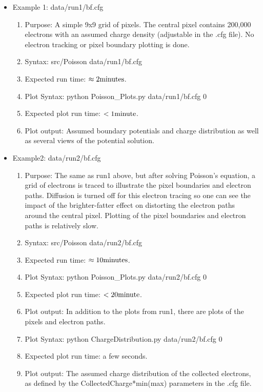 \documentclass{article} %
\begin{document}
\begin{itemize}
  \item Example 1: data/run1/bf.cfg
    \begin{enumerate}
      \item Purpose: A simple 9x9 grid of pixels.  The central pixel contains 200,000 electrons with an assumed charge density (adjustable in the .cfg file).  No electron tracking or pixel boundary plotting is done.  
      \item Syntax: src/Poisson data/run1/bf.cfg
      \item Expected run time: $\rm \approx 2 minutes$.
      \item Plot Syntax: python Poisson\_Plots.py data/run1/bf.cfg 0
      \item Expected plot run time: $\rm <1 minute$.
      \item Plot output: Assumed boundary potentials and charge distribution as well as several views of the potential solution. 
    \end{enumerate}

      \item Example2: data/run2/bf.cfg
    \begin{enumerate}
      \item Purpose: The same as run1 above, but after solving Poisson's equation, a grid of electrons is traced to illustrate the pixel boundaries and electron paths. Diffusion is turned off for this electron tracing so one can see the impact of the brighter-fatter effect on distorting the electron paths around the central pixel.  Plotting of the pixel boundaries and electron paths is relatively slow.
      \item Syntax: src/Poisson data/run2/bf.cfg
      \item Expected run time: $\rm \approx 10 minutes$.
      \item Plot Syntax: python Poisson\_Plots.py data/run2/bf.cfg 0
      \item Expected plot run time: $\rm <20 minute$.
      \item Plot output: In addition to the plots from run1, there are plots of the pixels and electron paths.        
      \item Plot Syntax: python ChargeDistribution.py data/run2/bf.cfg 0
      \item Expected plot run time: a few seconds.
      \item Plot output: The assumed charge distribution of the collected electrons, as defined by the CollectedCharge*min(max) parameters in the .cfg file.
    \end{enumerate}


\end{itemize}
\end{document}
